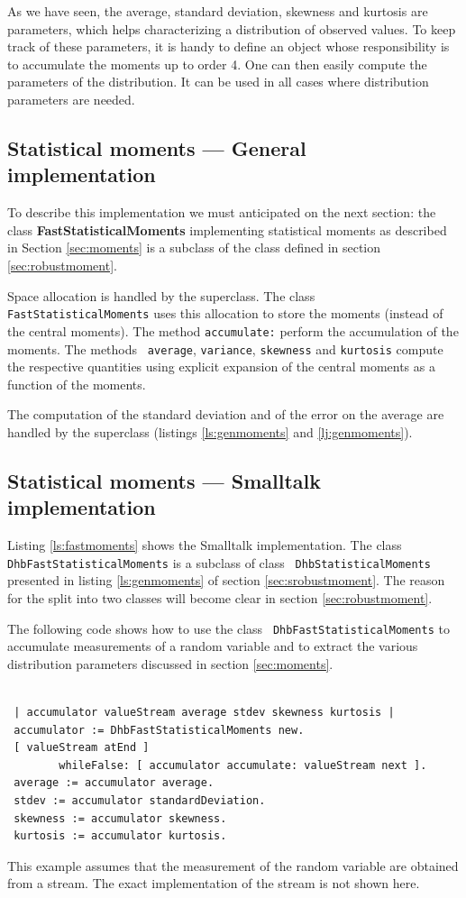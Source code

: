 \documentclass[twoside]{book}
\begin{document}
As we have seen, the average, standard deviation, skewness and
kurtosis are parameters, which helps characterizing a distribution
of observed values. To keep track of these parameters, it is handy
to define an object whose responsibility is to accumulate the
moments up to order 4. One can then easily compute the parameters
of the distribution. It can be used in all cases where
distribution parameters are needed.

\subsection{Statistical moments --- General implementation}
 To describe this implementation
we must anticipated on the next section: the class {\bf
FastStatisticalMoments} implementing statistical moments as
described in Section \ref{sec:moments} is a subclass of the class
defined in section \ref{sec:robustmoment}.

Space allocation is handled by the superclass. The class {\tt
FastStatisticalMoments} uses this allocation to store the moments
(instead of the central moments). The method {\tt accumulate:}
perform the accumulation of the moments. The methods {\tt
average}, {\tt variance}, {\tt skewness} and {\tt kurtosis}
compute the respective quantities using explicit expansion of the
central moments as a function of the moments.

The computation of the standard deviation and of the error on the
average are handled by the superclass (\cf listings
\ref{ls:genmoments} and \ref{lj:genmoments}).


\subsection{Statistical moments --- Smalltalk implementation}
\label{sec:smoments}Listing \ref{ls:fastmoments} shows the
Smalltalk implementation. The class {\tt
DhbFastStatisticalMoments} is a subclass of class {\tt
DhbStatisticalMoments} presented in listing \ref{ls:genmoments} of
section \ref{sec:srobustmoment}. The reason for the split into two
classes will become clear in section \ref{sec:robustmoment}.

The following code shows how to use the class {\tt
DhbFastStatisticalMoments} to accumulate measurements of a random
variable and to extract the various distribution parameters
discussed in section \ref{sec:moments}.
\begin{codeExample}
\label{ex:smoments}
\begin{verbatim}

 | accumulator valueStream average stdev skewness kurtosis |
 accumulator := DhbFastStatisticalMoments new.
 [ valueStream atEnd ]
        whileFalse: [ accumulator accumulate: valueStream next ].
 average := accumulator average.
 stdev := accumulator standardDeviation.
 skewness := accumulator skewness.
 kurtosis := accumulator kurtosis.
\end{verbatim}
\end{codeExample}
This example assumes that the measurement of the random variable
are obtained from a stream. The exact implementation of the stream
is not shown here.
\end{document}
